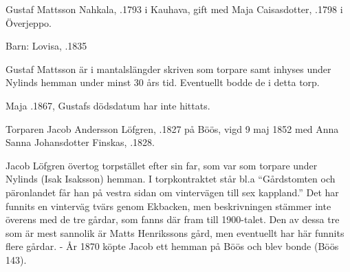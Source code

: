 %
Gustaf Mattsson Nahkala, .1793 i Kauhava, gift med Maja Caisasdotter, .1798 i Överjeppo.

Barn:	Lovisa, .1835

Gustaf Mattsson är i mantalslängder skriven som torpare samt inhyses under Nylinds hemman under minst 30 års tid. Eventuellt bodde de i detta torp.

Maja .1867, Gustafs dödsdatum har inte hittats.



%

%
Torparen Jacob Andersson Löfgren, .1827 på Böös, vigd 9 maj 1852 med Anna Sanna Johansdotter Finskas, .1828.
\begin{jhchildren}
  \item {}
  \item {}
  \item {}
  \item {}
  \item {}
  \item {}
  \item {}
\end{jhchildren}
Jacob Löfgren övertog torpstället efter sin far, som var som torpare under Nylinds (Isak Isaksson) hemman. I torpkontraktet står bl.a ``Gårdstomten och päronlandet får han på vestra sidan om vintervägen till sex kappland.'' Det har funnits en vinterväg tvärs genom Ekbacken, men beskrivningen stämmer inte överens med de tre gårdar, som fanns där fram till 1900-talet. Den av dessa tre som är mest sannolik är Matts Henrikssons gård, men eventuellt har här funnits flere gårdar. - År 1870 köpte Jacob ett hemman på Böös och blev bonde (Böös 143).


